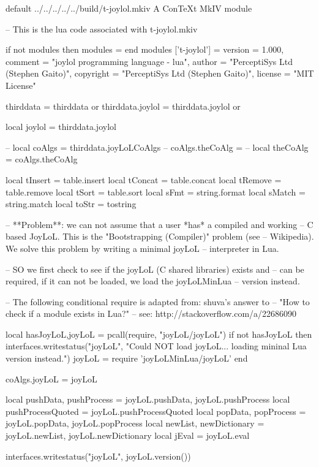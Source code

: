 \createMkIVCodeFile%
  {default}%
  {../../../../../build/t-joylol.mkiv}%
  {A ConTeXt MkIV module}

\startLuaCode
-- This is the lua code associated with t-joylol.mkiv

if not modules then modules = { } end modules ['t-joylol'] = {
    version   = 1.000,
    comment   = "joylol programming language - lua",
    author    = "PerceptiSys Ltd (Stephen Gaito)",
    copyright = "PerceptiSys Ltd (Stephen Gaito)",
    license   = "MIT License"
}

thirddata        = thirddata        or {}
thirddata.joylol = thirddata.joylol or {}

local joylol   = thirddata.joylol

-- local coAlgs     = thirddata.joyLoLCoAlgs
-- coAlgs.theCoAlg  = {}
-- local theCoAlg   = coAlgs.theCoAlg


local tInsert = table.insert
local tConcat = table.concat
local tRemove = table.remove
local tSort   = table.sort
local sFmt    = string.format
local sMatch  = string.match
local toStr   = tostring

-- **Problem**: we can not assume that a user *has* a compiled and working 
-- C based JoyLoL. This is the "Bootstrapping (Compiler)" problem (see 
-- Wikipedia). We solve this problem by writing a minimal joyLoL 
-- interpreter in Lua. 

-- SO we first check to see if the joyLoL (C shared libraries) exists and 
-- can be required, if it can not be loaded, we load the joyLoLMinLua 
-- version instead. 

-- The following conditional require is adapted from: shuva's answer to 
--  "How to check if a module exists in Lua?"
-- see: http://stackoverflow.com/a/22686090

local hasJoyLoL,joyLoL = pcall(require, "joyLoL/joyLoL")
if not hasJoyLoL then
  interfaces.writestatus("joyLoL",
    "Could NOT load joyLoL... loading mininal Lua version instead.")
  joyLoL = require 'joyLoLMinLua/joyLoL'
end

coAlgs.joyLoL = joyLoL

local pushData, pushProcess = joyLoL.pushData, joyLoL.pushProcess
local pushProcessQuoted = joyLoL.pushProcessQuoted
local popData, popProcess   = joyLoL.popData, joyLoL.popProcess
local newList, newDictionary = joyLoL.newList, joyLoL.newDictionary
local jEval = joyLoL.eval

interfaces.writestatus("joyLoL", joyLoL.version())

